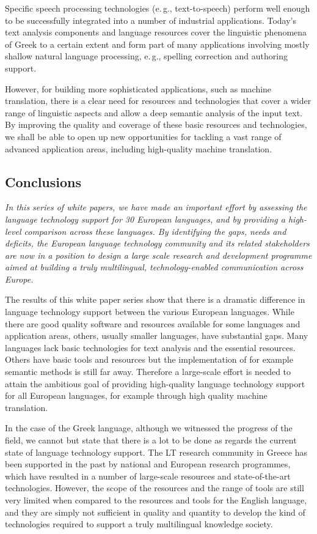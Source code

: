 \begin{multicols}{2}
Specific speech processing technologies (e.\,g., text-to-speech) perform well enough to be successfully integrated into a number of industrial applications. Today’s text analysis components and language resources  cover the linguistic phenomena of Greek to a certain extent and form part of many applications involving mostly shallow natural language processing, e.\,g., spelling correction and authoring support.

However, for building more sophisticated applications, such as machine translation, there is a clear need for resources and technologies that cover a wider range of linguistic aspects and allow a deep semantic analysis of the input text. By improving the quality and coverage of these basic resources and technologies, we shall be able to open up new opportunities for tackling a vast range of advanced application areas, including high-quality machine translation.

\subsection{Conclusions}

\emph{In this series of white papers, we have made an important effort by assessing the language technology support for 30 European languages, and by providing a high-level comparison across these languages. By identifying the gaps, needs and deficits, the European language technology community and its related stakeholders are now in a position to design a large scale research and development programme aimed at building a truly multilingual, technology-enabled communication across Europe.}

The results of this white paper series show that there is a dramatic difference in language technology support between the various European languages. While there are good quality software and resources available for some languages and application areas, others, usually smaller languages, have substantial gaps. Many languages lack basic technologies for text analysis and the essential resources. Others have basic tools and resources but the implementation of for example semantic methods is still far away. Therefore a large-scale effort is needed to attain the ambitious goal of providing high-quality language technology support for all European languages, for example through high quality machine translation. 

In the case of the Greek language, although we witnessed the progress of the field, we cannot but state that there is a lot to be done as regards the current state of language technology support. The LT research community in Greece has been supported in the past by national and European research programmes, which have resulted in a number of large-scale resources and state-of-the-art technologies. However, the scope of the resources and the range of tools are still very limited when compared to the resources and tools for the English language, and they are simply not sufficient in quality and quantity to develop the kind of technologies required to support a truly multilingual knowledge society.


\end{multicols}
